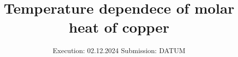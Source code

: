 

\subject{v47}
\title{Temperature dependece of molar heat of copper}
\date{%
  Execution: 02.12.2024
  \hspace{3em}
  Submission: DATUM
}



\maketitle
\thispagestyle{empty}
\tableofcontents
\newpage






\printbibliography{}


